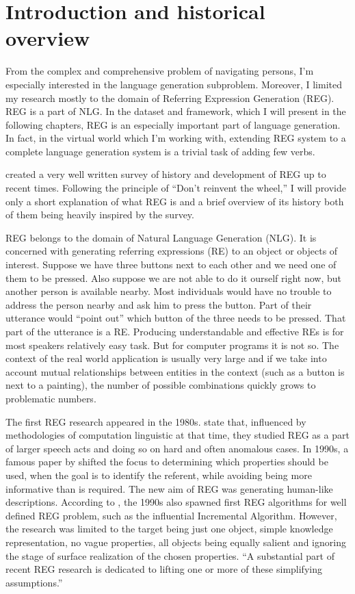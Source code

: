 \section{Introduction and historical overview}
\label{sec:bg-reg}
From the complex and comprehensive problem of navigating persons, I'm especially interested in the language generation subproblem. Moreover, I limited my research mostly to the domain of Referring Expression Generation (REG). REG is a part of NLG. In the dataset and framework, which I will present in the following chapters, REG is an especially important part of language generation. In fact, in the virtual world which I'm working with, extending REG system to a complete language generation system is a trivial task of adding few verbs.

\citet{krahmer2012computational} created a very well written survey of history and development of REG up to recent times. Following the principle of ``Don't reinvent the wheel,'' I will provide only a short explanation of what REG is and a brief overview of its history both of them being heavily inspired by the survey.

REG belongs to the domain of Natural Language Generation (NLG). It is concerned with generating referring expressions (RE) to an object or objects of interest. Suppose we have three buttons next to each other and we need one of them to be pressed. Also suppose we are not able to do it ourself right now, but another person is available nearby. Most individuals would have no trouble to address the person nearby and ask him to press the button. Part of their utterance would ``point out'' which button of the three needs to be pressed. That part of the utterance is a RE. Producing understandable and effective REs is for most speakers relatively easy task. But for computer programs it is not so. The context of the real world application is usually very large and if we take into account mutual relationships between entities in the context (such as a button is next to a painting), the number of possible combinations quickly grows to problematic numbers. 

The first REG research appeared in the 1980s. \citet{krahmer2012computational} state that, influenced by methodologies of computation linguistic at that time, they studied REG as a part of larger speech acts and doing so on hard and often anomalous cases. In 1990s, a famous paper by \citet{dale1995computational} shifted the focus to determining which properties should be used, when the goal is to identify the referent, while avoiding being more informative than is required. The new aim of REG was generating human-like descriptions.  According to \citet{krahmer2012computational}, the 1990s also spawned first REG algorithms for well defined REG problem, such as the influential Incremental Algorithm. However, the research was limited to the target being just one object, simple knowledge representation, no vague properties, all objects being equally salient and ignoring the stage of surface realization of the chosen properties. ``A substantial part of recent REG research is dedicated to lifting one or more of these simplifying assumptions.'' \citep{krahmer2012computational} 

